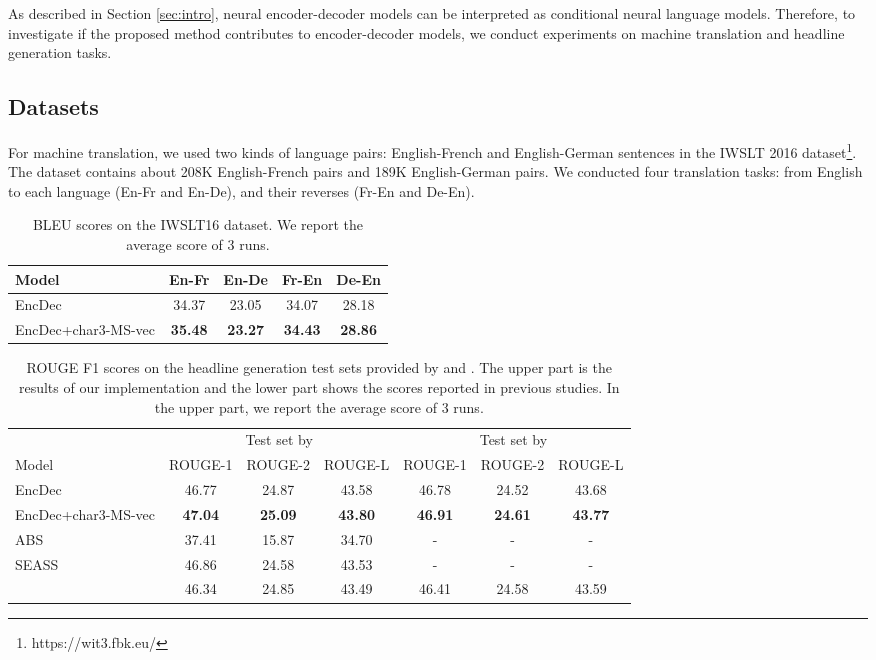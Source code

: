\documentclass[letterpaper]{article} %
\begin{document}
As described in Section \ref{sec:intro}, neural encoder-decoder models can be interpreted as conditional neural language models.
Therefore, to investigate if the proposed method contributes to encoder-decoder models, we conduct experiments on machine translation and headline generation tasks.


\subsection{Datasets}
For machine translation, we used two kinds of language pairs: English-French and English-German sentences in the IWSLT 2016 dataset\footnote{https://wit3.fbk.eu/}.
The dataset contains about 208K English-French pairs and 189K English-German pairs.
We conducted four translation tasks: from English to each language (En-Fr and En-De), and their reverses (Fr-En and De-En).


\begin{table}[!t]
  \centering
  \begin{tabular}{ l | c  c  c  c }
  \toprule
  Model & En-Fr & En-De & Fr-En & De-En \\
  \midrule
  EncDec & 34.37 & 23.05 & 34.07 & 28.18 \\
  EncDec+char3-MS-vec & {\bf 35.48} & {\bf 23.27} & {\bf 34.43} & {\bf 28.86} \\
  \bottomrule
  \end{tabular}
  \caption{BLEU scores on the IWSLT16 dataset. We report the average score of 3 runs.\label{tb:nmt}}
\end{table}


\begin{table}[!t]
  \centering
  \small
  \begin{tabular}{ l | c c c | c c c }
  \toprule
  & \multicolumn{3}{c|}{Test set by \cite{zhou-EtAl:2017:Long}} & \multicolumn{3}{c}{Test set by \cite{kiyono}} \\
  Model & ROUGE-1 & ROUGE-2 & ROUGE-L & ROUGE-1 & ROUGE-2 & ROUGE-L \\
  \midrule
  EncDec & 46.77 & 24.87 & 43.58 & 46.78 & 24.52 & 43.68 \\
  EncDec+char3-MS-vec & {\bf 47.04} & {\bf 25.09} & {\bf 43.80} & {\bf 46.91} & {\bf 24.61} & {\bf 43.77} \\
  \midrule
  ABS \cite{rush-chopra-weston:2015:EMNLP} & 37.41 & 15.87 & 34.70 & - & - & - \\
  SEASS \cite{zhou-EtAl:2017:Long} & 46.86 & 24.58 & 43.53 & - & - & - \\ %
  \cite{kiyono} & 46.34 & 24.85 & 43.49  & 46.41 & 24.58 & 43.59 \\
  \bottomrule
  \end{tabular}
  \caption{ROUGE F1 scores on the headline generation test sets provided by \protect\cite{zhou-EtAl:2017:Long} and \protect\cite{kiyono}. The upper part is the results of our implementation and the lower part shows the scores reported in previous studies. In the upper part, we report the average score of 3 runs.\label{tb:headline}}
\end{table}
\end{document}
